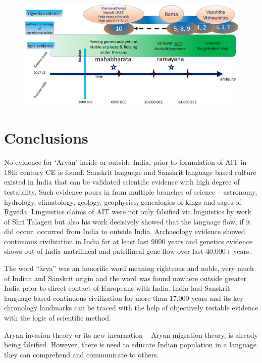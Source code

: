 \begin{figure}[!htbp]
\includegraphics[scale=0.205]{"images/8-24.jpg"}
\caption{}\label{art8-fig24}
\end{figure}



\section*{Conclusions}

No evidence for ‘Aryan’ inside or outside India, prior to formulation of AIT in 18th century CE is found. Sanskrit language and Sanskrit language based culture existed in India that can be validated scientific evidence with high degree of testability. Such evidence pours in from multiple branches of science – astronomy, hydrology, climatology, geology, geophysics, genealogies of kings and sages of Ṛgveda. Linguistics claims of AIT were not only falsified via linguistics by work of Shri Talageri but also his work decisively showed that the language flow, if it did occur, occurred from India to outside India. Archaeology evidence showed continuous civilization in India for at least last 9000 years and genetics evidence shows out of India matrilineal and patrilineal gene flow over last 40,000+ years.

The word “ārya” was an honorific word meaning righteous and noble, very much of Indian and Sanskrit origin and the word was found nowhere outside greater India prior to direct contact of Europeans with India. India had Sanskrit language based continuous civilization for more than 17,000 years and its key chronology landmarks can be traced with the help of objectively testable evidence with the logic of scientific method.

Aryan invasion theory or its new incarnation – Aryan migration theory, is already being falsified. However, there is need to educate Indian population in a language they can comprehend and communicate to others.


